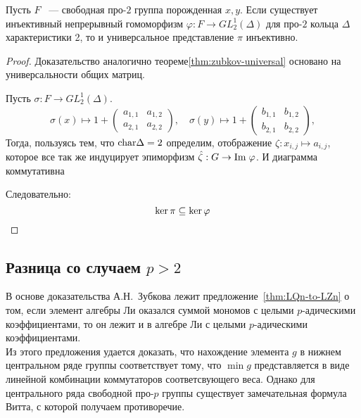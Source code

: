 \begin{theorem}
    Пусть $F$ ~--- свободная про-$2$ группа порожденная $x, y$.
    Если существует инъективный непрерывный гомоморфизм $\varphi: F \to GL^1_2(\Delta)$ для про-$2$ кольца $\Delta$ характеристики 2, то и универсальное представление $\pi$ инъективно.
\end{theorem}
\begin{proof}
    Доказательство аналогично теореме\ref{thm:zubkov-universal} основано на универсальности общих матриц.

    Пусть $\sigma: F\to GL_2^1(\Delta)$.
    \[
        \sigma (x) \mapsto 1 +
        \begin{pmatrix}
            a_{1,1} & a_{1,2} \\
            a_{2,1} & a_{2,2}
        \end{pmatrix}, \quad
        \sigma (y) \mapsto 1 +
        \begin{pmatrix}
            b_{1,1} & b_{1,2} \\
            b_{2,1} & b_{2,2}
        \end{pmatrix},
    \]
    Тогда, пользуясь тем, что $\mathrm{char} \Delta = 2$ определим, отображение $\zeta: x_{i,j}\mapsto a_{i,j}$, которое все так же индуцирует эпиморфизм $\hat{\zeta}: G \to \mathrm{Im}\hspace{0.1cm}{\varphi}$.
    И диаграмма коммутативна
    \begin{center}
    \end{center}
    Следовательно:
    \[
        \ker{\pi} \subseteq \ker{\varphi} \qedhere
    \]
\end{proof}

\subsection{Разница со случаем $p>2$}\label{subsec:ben-ezra-zelmanov-difference}
В основе доказательства А.Н.\ Зубкова лежит предложение~\ref{thm:LQn-to-LZn} о том,
если элемент алгебры Ли оказался суммой мономов с целыми $p$-адическими коэффициентами, то он лежит и в алгебре Ли с целыми $p$-адическими коэффициентами.\\
Из этого предложения удается доказать, что нахождение элемента $g$ в нижнем центральном ряде группы соответствует тому, что $\min g$ представляется в виде линейной комбинации коммутаторов соответсвующего веса.
Однако для центрального ряда свободной про-$p$ группы существует замечательная формула Витта, с которой получаем противоречие.

